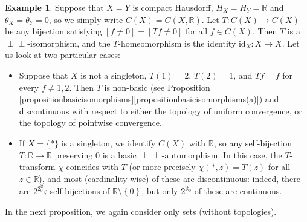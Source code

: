 \documentclass[letter,11pt]{amsart}
\theoremstyle{plain}		\newtheorem{theorem}[generalnumbering]{Theorem}
\theoremstyle{plain}		\newtheorem{corollary}[generalnumbering]{Corollary}
\theoremstyle{definition}		\newtheorem{definition}[generalnumbering]{Definition}
\theoremstyle{definition}		\newtheorem{example}[generalnumbering]{Example}
\theoremstyle{plain}		\newtheorem{proposition}[generalnumbering]{Proposition}
\theoremstyle{plain}		\newtheorem{lemma}[generalnumbering]{Lemma}
\theoremstyle{definition}
\newcommand{\perpp}{\perp\!\!\!\perp}
\newcommand{\id}{\mathrm{id}}
\begin{document}
\begin{example}
	Suppose that $X=Y$ is compact Hausdorff, $H_X=H_Y=\mathbb{R}$ and $\theta_X=\theta_Y=0$, so we simply write $C(X)=C(X,\mathbb{R})$. Let $T\colon C(X)\to C(X)$ be any bijection satisfying $[f\neq 0]=[Tf\neq 0]$ for all $f\in C(X)$. Then $T$ is a $\perpp$-isomorphism, and the $T$-homeomorphism is the identity $\id_X\colon X\to X$. Let us look at two particular cases:
	\begin{itemize}
		\item Suppose that $X$ is not a singleton, $T(1)=2$, $T(2)=1$, and $Tf=f$ for every $f\neq 1,2$. Then $T$ is non-basic (see Proposition \ref{propositionbasicisomorphisms}\ref{propositionbasicisomorphisms(a)}) and discontinuous with respect to either the topology of uniform convergence, or the topology of pointwise convergence.
		
		\item If $X=\{\ast\}$ is a singleton, we identify $C(X)$ with $\mathbb{R}$, so any self-bijection $T\colon\mathbb{R}\to\mathbb{R}$ preserving $0$ is a basic $\perpp$-automorphism. In this case, the $T$-transform $\chi$ coincides with $T$ (or more precisely $\chi(\ast,z)=T(z)$ for all $z\in\mathbb{R}$), and most (cardinality-wise) of these are discontinuous: indeed, there are $2^{2^\aleph_0}\mathfrak{c}$ self-bijections of $\mathbb{R}\setminus\left\{0\right\}$, but only $2^{\aleph_0}$ of these are continuous.
	\end{itemize}
\end{example}

In the next proposition, we again consider only sets (without topologies).
\end{document}
